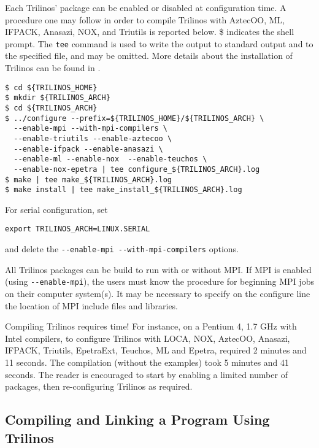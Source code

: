 \smallskip

Each Trilinos' package can be enabled or disabled at configuration time.
A procedure one may follow in order to compile Trilinos with AztecOO,
ML, IFPACK, Anasazi, NOX, and Triutils is reported below. \$ indicates the
shell prompt. The \verb!tee! command is used to write the output to
standard output and to the specified file, and may be omitted.  More
details about the installation of Trilinos can be found in
\cite{Trilinos-Users-Guide}.
\begin{verbatim}
$ cd ${TRILINOS_HOME}
$ mkdir ${TRILINOS_ARCH}
$ cd ${TRILINOS_ARCH}
$ ../configure --prefix=${TRILINOS_HOME}/${TRILINOS_ARCH} \
  --enable-mpi --with-mpi-compilers \
  --enable-triutils --enable-aztecoo \
  --enable-ifpack --enable-anasazi \
  --enable-ml --enable-nox  --enable-teuchos \
  --enable-nox-epetra | tee configure_${TRILINOS_ARCH}.log
$ make | tee make_${TRILINOS_ARCH}.log
$ make install | tee make_install_${TRILINOS_ARCH}.log
\end{verbatim}
For serial configuration, set
\begin{verbatim}
export TRILINOS_ARCH=LINUX.SERIAL
\end{verbatim}
and delete the \verb!--enable-mpi --with-mpi-compilers! options.
\begin{remark}
  All Trilinos packages can be build to run with or without MPI. If MPI
  is enabled (using \verb!--enable-mpi!), the users must know the
  procedure for beginning MPI jobs on their computer system(s). It may be
  necessary to specify on the configure line the location of MPI include
  files and libraries.
\end{remark}

\begin{remark}
  Compiling Trilinos requires time! For instance, on a Pentium 4, 1.7
  GHz with Intel compilers, to configure Trilinos with LOCA, NOX,
  AztecOO, Anasazi, IFPACK, Triutils, EpetraExt, Teuchos, ML and Epetra,
  required 2 minutes and 11 seconds. The compilation (without the
  examples) took 5 minutes and 41 seconds. The reader is encouraged to
  start by enabling a limited number of packages, then re-configuring
  Trilinos as required.
\end{remark}


\subsection{Compiling and Linking a Program Using Trilinos}
\label{sec:intro_compiling}

